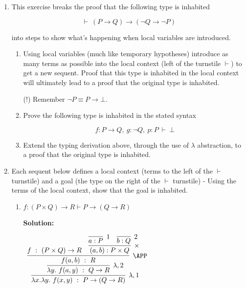 \documentclass[11pt]{report}
\begin{document}
\begin{enumerate}
	
	\item This exercise breaks the proof that the following type is inhabited
	
	$$\vdash \ (P \to Q) \to (\lnot Q \to \lnot P)$$

	into steps to show what's happening when local variables are introduced. 

	\begin{enumerate}

		\item Using local variables (much like temporary hypotheses) introduce as many terms as possible into the local context (left of the turnstile $\vdash$) to get a new sequent. Proof that this type is inhabited in the local context will ultimately lead to a proof that the original type is inhabited. 
		
		(!) Remember $\lnot P \equiv P \to \bot$.

		\item Prove the following type is inhabited in the stated syntax 
		
		$$ f : P \to Q, \ g : \lnot Q, \ p : P \ \vdash \ \bot$$

		\item Extend the typing derivation above, through the use of $\lambda$ abstraction, to a proof that the original type is inhabited.

	\end{enumerate}
	
	\item Each sequent below defines a local context (terms to the left of the $\vdash$ turnstile) and a goal (the type on the right of the $\vdash$ turnstile) - Using the terms of the local context, show that the goal is inhabited.

	\begin{enumerate}
		\item $f : ( P\times Q) \rightarrow  R \vdash  P \rightarrow (Q \rightarrow  R)$
		
		{\bf Solution:}
			\begin{mdframed}
				\begin{center}
					$\begin{array}{c}
						\infer[\lambda,1]{\lambda x. \lambda y. \ f(x,y) \ : \ P\to(Q\to R)}
							{\infer[\lambda,2]{\lambda y. \ f(a,y) \ : \ Q\to R}
								{\infer[\APP]{f(a,b) \ : \ R}
									{f \ : \ (P\times Q) \to R
									&
									\infer[\times]{(a,b) : P\times Q}
										{\infer[1]{a:P}{}
										&
										\infer[2]{b:Q}{}}}}}
					\end{array}$
				\end{center}
			\end{mdframed}
			

\end{enumerate}
\end{enumerate}
\end{document}

